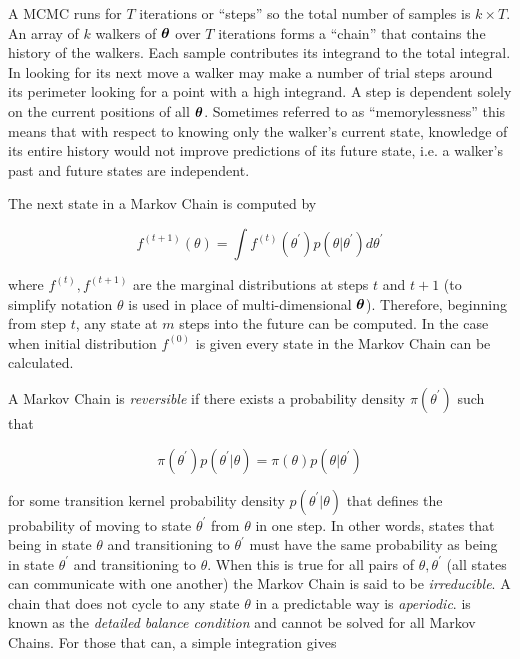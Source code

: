 A MCMC runs for $T$ iterations or ``steps'' so the total number of samples is $k \times T$.    An array of $k$ walkers of
$\boldsymbol{\theta}$ over $T$ iterations forms a ``chain'' that contains the history of the walkers.  Each sample contributes its
integrand to the total integral.  In looking for its next move a walker may make a number of trial steps around its perimeter looking for
a point with a high integrand.  A step is dependent solely on the current positions of all $\boldsymbol{\theta}$.  Sometimes referred to as
``memorylessness'' this means that with respect to knowing only the walker's current state, knowledge of its entire history would not
improve predictions of its future state, i.e. a walker's past and future states are independent.

The next state in a Markov Chain is computed by

\begin{equation}
f^{(t + 1)} (\theta) = \int f^{(t)} (\theta^{\prime}) p(\theta|\theta^{\prime}) d\theta^{\prime}
\label{eq:er_nr_calibrations_parameter_determ_mcmc_marginal}
\end{equation}

\noindent where $f^{(t)}, f^{(t + 1)}$ are the marginal distributions at steps $t$ and $t + 1$ (to simplify notation $\theta$
is used in place of multi-dimensional $\boldsymbol{\theta}$).  Therefore, beginning from step $t$, any state
at $m$ steps into the future can be computed.  In the case when initial distribution $f^{(0)}$ is given every state in the Markov Chain
can be calculated.

A Markov Chain is \textit{reversible} if there exists a probability density $\pi (\theta^{\prime})$ such that

\begin{equation}
\pi (\theta^{\prime}) p(\theta^{\prime}|\theta) = \pi (\theta) p(\theta|\theta^{\prime})
\label{eq:er_nr_calibrations_parameter_determ_mcmc_detailed_balance}
\end{equation}

\noindent for some transition kernel probability density $p(\theta^{\prime}|\theta)$ that defines the probability of
moving to state $\theta^{\prime}$ from $\theta$ in one step.  In other words, 
 states that being in state $\theta$ and transitioning to
$\theta^{\prime}$ must have the same probability as being in state $\theta^{\prime}$ and transitioning to  $\theta$.  When
this is true for all pairs of $\theta, \theta^{\prime}$ (all states can communicate with one another) the Markov Chain
is said to be \textit{irreducible}.  A chain that does not cycle to any state $\theta$ in a predictable way is
\textit{aperiodic}.  
is known as the \textit{detailed balance condition} and cannot be solved for all Markov Chains.  For those that can, a simple integration
gives

